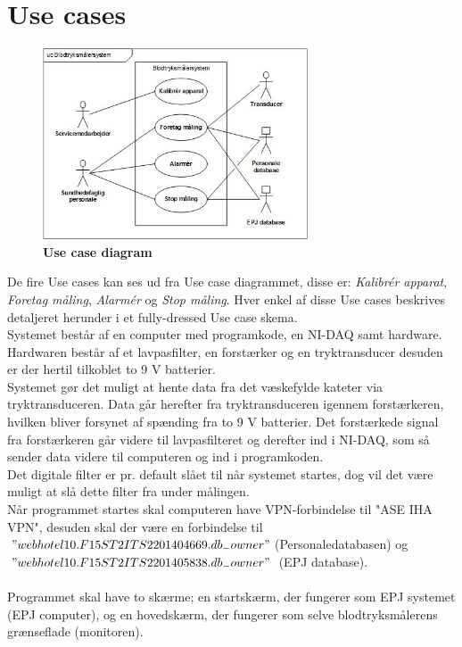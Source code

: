 \section{Use cases}
\begin{figure}[H]
\includegraphics[width =0.7\textwidth , center]{billeder/UseCaseDiagram}
\caption{\textbf{Use case diagram}}
\end{figure}
De fire Use cases kan ses ud fra Use case diagrammet, disse er: \textit{Kalibrér apparat}, \textit{Foretag måling}, \textit{Alarmér} og \textit{Stop måling}. Hver enkel af disse Use cases beskrives detaljeret herunder i et fully-dressed Use case skema.\\
Systemet består af en computer med programkode, en NI-DAQ samt hardware. Hardwaren består af et lavpasfilter, en forstærker og en tryktransducer desuden er der hertil tilkoblet to 9 V batterier.
\\
Systemet gør det muligt at hente data fra det væskefylde kateter via tryktransduceren. Data går herefter fra tryktransduceren igennem forstærkeren, hvilken bliver forsynet af spænding fra to 9 V batterier. Det forstærkede signal fra forstærkeren går videre til lavpasfilteret og derefter ind i NI-DAQ, som så sender data videre til computeren og ind i programkoden. 
\\ 
Det digitale filter er pr. default slået til når systemet startes, dog vil det være muligt at slå dette filter fra under målingen.\\
Når programmet startes skal computeren have VPN-forbindelse til "ASE IHA VPN", desuden skal der være en forbindelse til $"webhotel10.F15ST2ITS2201404669.db_{-}owner"$(Personaledatabasen) og $"webhotel10.F15ST2ITS2201405838.db_{-}owner"$ (EPJ database).\\\\
Programmet skal have to skærme; en startskærm, der fungerer som EPJ systemet (EPJ computer), og en hovedskærm, der fungerer som selve blodtryksmålerens grænseflade (monitoren).

